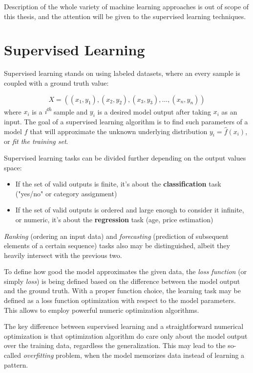 \documentclass[thesis=B,english]{FITthesis}[2019/12/23]
\begin{document}
Description of the whole variety of machine learning approaches is out of scope of this thesis, and the attention will be given to the supervised learning techniques.

\section{Supervised Learning}

Supervised learning stands on using labeled datasets, where an every sample is coupled with a ground truth value:

\[ X = ((x_1, y_1), (x_2, y_2), (x_3, y_3), \dots,(x_n, y_n)) \]
where $x_i$ is a \textit{i\textsuperscript{th}} sample and $y_i$ is a desired model output after taking $x_i$ as an input. The goal of a supervised learning algorithm is to find such parameters of a model $f$  that will approximate the unknown underlying distribution $y_i = \hat{f}(x_i)$\cite{theoretical_ml}, or \textit{fit the training set}.

Supervised learning tasks can be divided further depending on the output values space:
\begin{itemize}
	\item If the set of valid outputs is finite, it's about the \textbf{classification} task ("yes/no" or category assignment)
	\item If the set of valid outputs is ordered and large enough to consider it infinite, or numeric, it's about the \textbf{regression} task (age, price estimation)
\end{itemize}
\textit{Ranking} (ordering an input data) and \textit{forecasting} (prediction of subsequent elements of a certain sequence) tasks also may be distinguished, albeit they heavily intersect with the previous two.

To define how good the model approximates the given data, the \textit{loss function} (or simply \textit{loss}) is being defined based on the difference between the model output and the ground truth. With a proper function choice, the learning task may be defined as a loss function optimization with respect to the model parameters. This allows to employ powerful numeric optimization algorithms.

The key difference between supervised learning and a straightforward numerical optimization is that optimization algorithm do care only about the model output over the training data, regardless the generalization. This may lead to the so-called \textit{overfitting} problem, when the model memorizes data instead of learning a pattern.
\end{document}
